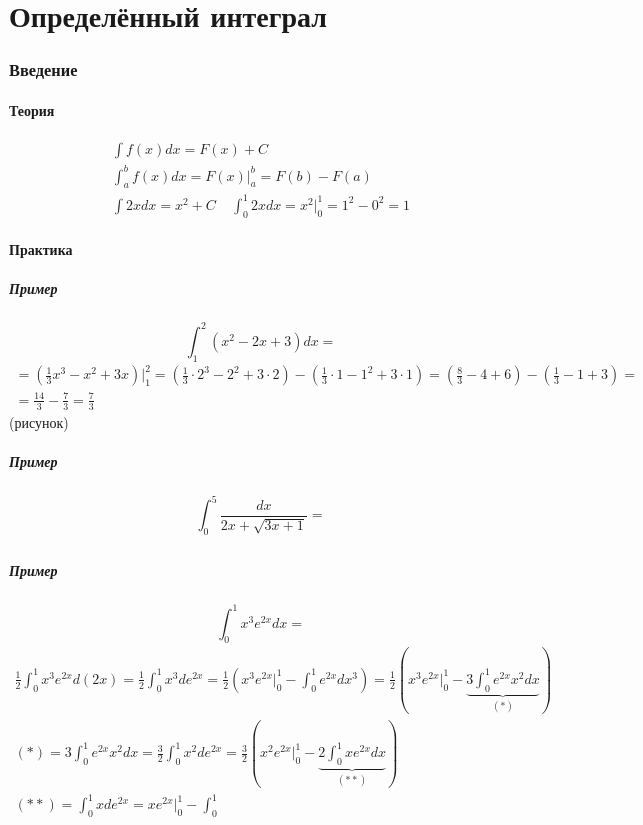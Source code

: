 \documentclass{article}
\begin{document}
\newpage
\part{Определённый интеграл}
\section{Введение}
\subsection{Теория}
\begin{gather*}
    \int f(x) dx = F(x) + C \\
    \int_{a}^{b} f(x) dx = F(x) \Big|_a^b = F(b) - F(a) \\
    \int 2xdx = x^2 + C ~~~~~ \int_{0}^{1} 2x dx = x^2 \Big|_0^1 = 1^2 - 0^2 = 1
\end{gather*}


\subsection{Практика}
\subsubsection{Пример}
\[
    \int_{1}^{2} (x^2 - 2x + 3) dx =
\]
\begin{gather*}
    = \left(\frac{1}{3}x^3 - x^2 + 3x\right) \Big|_1^2 =
    \left(\frac{1}{3} \cdot 2^3 - 2^2 + 3 \cdot 2\right) - \left(\frac{1}{3} \cdot 1 - 1^2 + 3 \cdot 1\right) =
    \left(\frac{8}{3} - 4 + 6\right) - \left(\frac{1}{3} - 1 + 3\right) = \\
    = \frac{14}{3} - \frac{7}{3}
    = \frac{7}{3}
\end{gather*}
(рисунок)

\subsubsection{Пример}
\[
    \int_{0}^{5} \frac{dx}{2x + \sqrt{3x + 1}} =
\]
\begin{gather*}    
\end{gather*}

\subsubsection{Пример}
\[
    \int_{0}^{1} x^3 e^{2x} dx =
\]
\begin{gather*}
    \frac{1}{2} \int_{0}^{1} x^3 e^{2x} d(2x) =
    \frac{1}{2} \int_{0}^{1} x^3 de^{2x} =
    \frac{1}{2} \left(x^3 e^{2x} \Big|_0^1 -  \int_{0}^{1} e^{2x} dx^3\right) =
    \frac{1}{2} \left(x^3 e^{2x} \Big|_0^1 - \underbrace{3\int_{0}^{1} e^{2x} x^2 dx}_{(*)}\right) \\
    (*) = 3\int_{0}^{1} e^{2x} x^2 dx = 
    \frac{3}{2} \int_{0}^{1} x^2 de^{2x} =
    \frac{3}{2} \left(x^2 e^{2x} \Big|_0^1 - \underbrace{2\int_{0}^{1} x e^{2x} dx}_{(**)}\right) \\
    (**) = \int_{0}^{1} x de^{2x} = x e^{2x} \Big|_0^1 - \int_{0}^{1}
\end{gather*}
\end{document}
